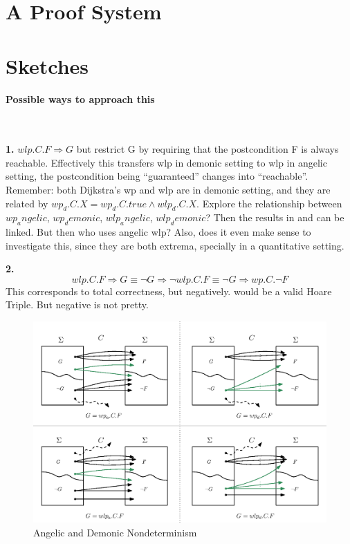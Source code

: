 \section{A Proof System}


\section{Sketches} 

\paragraph{Possible ways to approach this}\ 

\textbf{1.} $wlp.C.F \Longrightarrow G $ but restrict G by requiring that the postcondition F is always reachable. 
Effectively this transfers wlp in demonic setting to wlp in angelic setting, the postcondition being ``guaranteed'' changes into ``reachable''. 
Remember: both Dijkstra's wp and wlp are in demonic setting, and they are related by $wp_d.C.X = wp_d.C.true \wedge wlp_d.C.X$. 
Explore the relationship between $wp_angelic$, $wp_demonic$, $wlp_angelic$, $wlp_demonic$? 
Then the results in \cite{zhang22} and \cite{dijkstra90} can be linked. 
But then who uses angelic wlp? 
Also, does it even make sense to investigate this, since they are both extrema, specially in a quantitative setting. 

\textbf{2.}$$wlp.C.F \Longrightarrow G \equiv \neg G \Longrightarrow \neg wlp.C.F \equiv \neg G \Longrightarrow  wp.C.\neg F $$ 
This corresponds to total correctness, but negatively. 
 would be a valid Hoare Triple. 
But negative is not pretty. 

\begin{figure}[ht!]\centering
\includegraphics[width=\textwidth]{image/wp-wlp-angelic-demonic.eps}
\caption{Angelic and Demonic Nondeterminism}
\label{fig:ang-dem}
\end{figure}


